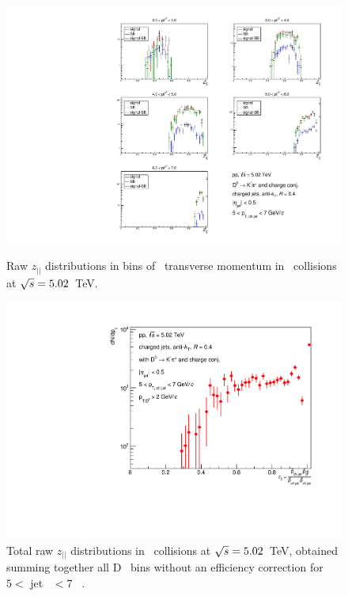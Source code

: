 \begin{figure}[bth]
\centering
\begin{minipage}{.65\textwidth}
  \centering
\includegraphics[width=\textwidth]{pp_2sig/R4_jetbin_5_7/jetRawSpectrum_pTD2}
\caption{Raw $z_{||}$ distributions in bins of \Dzero\ transverse momentum in \pp\ collisions at $\sqrt{s}=5.02$~TeV.}
\label{fig:eq_pp_signBkgJet_Dzero_5_7_R4}
\end{minipage}%
\begin{minipage}{.4\textwidth}
  \centering
\includegraphics[width=\textwidth]{pp_2sig/R4_jetbin_5_7/jetPtSpectrum_SB_pTD2}
\caption{Total raw $z_{||}$ distributions in \pp\ collisions at $\sqrt{s}=5.02$~TeV, obtained summing together all D \pt\ bins without an efficiency correction for $5<$ jet \pt\ $<7$ \GeVc\ .
}
\label{fig:eq_pp_signBkgJet_tot_5_7_R4}
\end{minipage}
\end{figure}
